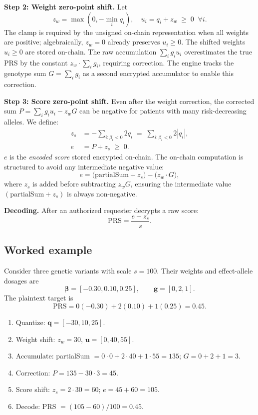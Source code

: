 \documentclass[10pt]{article}
\begin{document}
\textbf{Step 2: Weight zero-point shift.}  Let
\begin{equation}
z_w = \max(0,-\min_i q_i), \quad u_i = q_i + z_w \;\geq\; 0 \;\;\forall i.
\label{eq:wshift}
\end{equation}
The clamp is required by the unsigned on-chain representation when all weights are
positive; algebraically, $z_w=0$ already preserves $u_i\geq0$.  The shifted weights
$u_i \geq 0$ are stored on-chain.  The raw accumulation
$\sum_i g_i u_i$ overestimates the true PRS by the constant $z_w \cdot \sum_i g_i$,
requiring correction.  The engine tracks the genotype sum
$G = \sum_i g_i$ as a second encrypted accumulator to enable this correction.

\textbf{Step 3: Score zero-point shift.}
Even after the weight correction, the corrected sum
$P = \sum_i g_i u_i - z_w G$
can be negative for patients with many risk-decreasing alleles.  We define:
\begin{align}
z_s &= -\sum_{i:\beta_i<0} 2 q_i \;=\; \sum_{i:\beta_i<0} 2|q_i|,\\
e   &= P + z_s \;\geq\; 0.
\end{align}
$e$ is the \emph{encoded score} stored encrypted on-chain.  The on-chain
computation is structured to avoid any intermediate negative value:
\begin{equation}
e = \bigl(\mathrm{partialSum} + z_s\bigr) - \bigl(z_w \cdot G\bigr),
\label{eq:encode}
\end{equation}
where $z_s$ is added before subtracting $z_w G$, ensuring the intermediate
value $(\mathrm{partialSum} + z_s)$ is always non-negative.

\textbf{Decoding.}  After an authorized requester decrypts a raw score:
\begin{equation}
\mathrm{PRS} = \frac{e - z_s}{s}.
\end{equation}

\subsection{Worked example}

Consider three genetic variants with scale $s=100$.  Their weights and effect-allele
dosages are
\[
\boldsymbol{\beta}=[-0.30,0.10,0.25],\qquad \mathbf{g}=[0,2,1].
\]
The plaintext target is
\[
\mathrm{PRS}=0(-0.30)+2(0.10)+1(0.25)=0.45.
\]

\begin{enumerate}
  \item Quantize: $\mathbf{q} = [-30, 10, 25]$.
  \item Weight shift: $z_w = 30$, $\mathbf{u} = [0, 40, 55]$.
  \item Accumulate: partialSum $= 0{\cdot}0 + 2{\cdot}40 + 1{\cdot}55 = 135$;
        $G = 0 + 2 + 1 = 3$.
  \item Correction: $P = 135 - 30{\cdot}3 = 45$.
  \item Score shift: $z_s = 2{\cdot}30 = 60$; $e = 45 + 60 = 105$.
  \item Decode: PRS $= (105 - 60) / 100 = 0.45$.
\end{enumerate}
\end{document}
